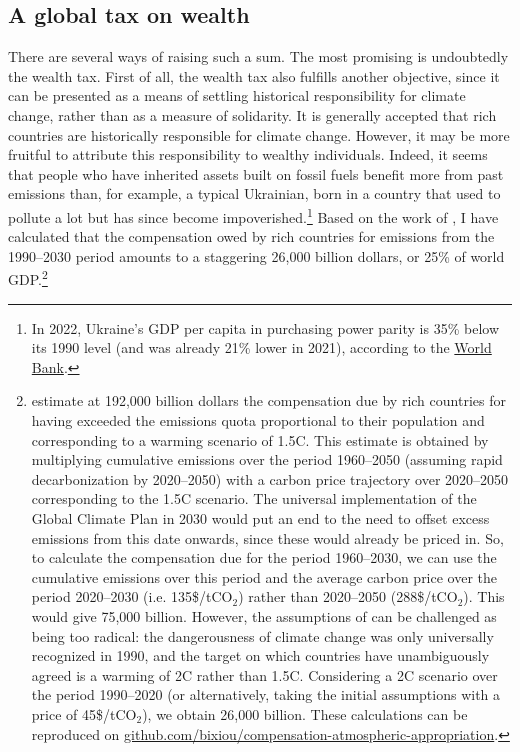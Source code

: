\documentclass[a5paper,english,openany]{memoir}
\begin{document}
\subsection{A global tax on wealth} %
There are several ways of raising such a sum. The most promising is undoubtedly the wealth tax. First of all, the wealth tax also fulfills another objective, since it can be presented as a means of settling 
historical responsibility for climate change, rather than as a measure of solidarity. It is generally accepted that rich countries are historically responsible for climate change. However, it may be more fruitful to attribute this responsibility to wealthy individuals. %
Indeed, it seems that people who have inherited assets built on fossil fuels benefit more from past emissions than, for example, a typical Ukrainian, born in a country that used to pollute a lot but has since become impoverished.\footnote{In 2022, Ukraine's GDP per capita in purchasing power parity is 35\% below its 1990 level (and was already 21\% lower in 2021), according to the \href{https://data.worldbank.org/indicator/NY.GDP.PCAP.PP.KD?locations=UA}{World Bank}.} %
Based on the work of \cite{fanning_compensation_2023}, I have calculated that the compensation owed by rich countries for emissions from the 1990--2030 period amounts to a staggering %
26,000 billion dollars, or 25\% of world GDP.\footnote{\cite{fanning_compensation_2023} estimate at 192,000 billion dollars the compensation due by rich countries for having exceeded the emissions quota proportional to their population and corresponding to a warming scenario of 1.5\textdegree{}C. This estimate is obtained by multiplying cumulative emissions over the period 1960--2050 (assuming rapid decarbonization by 2020--2050) %
with a carbon price trajectory over 2020--2050 corresponding to the 1.5\textdegree{}C scenario. The universal implementation of the Global Climate Plan in 2030 would put an end to the need to offset excess emissions from this date onwards, since these would already be priced in. %
So, to calculate the compensation due for the period 1960--2030, we can use the cumulative emissions over this period and the average carbon price over the period 2020--2030 (i.e. 135\$/tCO$_\text{2}$) rather than 2020--2050 (288\$/tCO$_\text{2}$). This would give 75,000 billion. However, the assumptions of \cite{fanning_compensation_2023} can be challenged as being too radical: the dangerousness of %
climate change was only universally recognized in 1990, and the target on which countries have unambiguously agreed is a warming of 2\textdegree{}C rather than 1.5\textdegree{}C. Considering a 2\textdegree{}C scenario over the period 1990--2020 (or alternatively, taking the initial assumptions with a price of 45\$/tCO$_\text{2}$), we obtain 26,000 billion. These calculations can be reproduced on \href{https://github.com/bixiou/compensation-atmospheric-appropriation}{github.com/bixiou/compensation-atmospheric-appropriation}.} 
\end{document}
